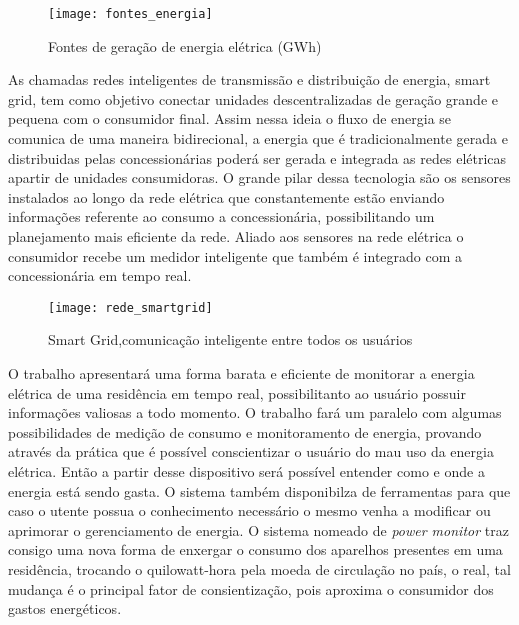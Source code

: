 \begin{figure}[h!]
	\texttt{[image: fontes\_energia]}
	\centering
	\caption[Fontes de geração de energia elétrica (GWh)]{Fontes de geração de energia elétrica (GWh)}
	\label{fig:fonte_energia}
\end{figure}
\FloatBarrier

As chamadas redes inteligentes de transmissão e distribuição de energia, smart grid, tem como objetivo conectar unidades descentralizadas de geração
grande e pequena com o consumidor final. Assim nessa ideia o fluxo de energia se comunica de uma maneira bidirecional, a energia que é tradicionalmente
gerada e distribuidas pelas concessionárias poderá ser gerada e integrada as redes elétricas apartir de unidades consumidoras. O grande pilar dessa 
tecnologia são os sensores instalados ao longo da rede elétrica que constantemente estão enviando informações referente ao consumo a concessionária,
possibilitando um planejamento mais eficiente da rede. Aliado aos sensores na rede elétrica o consumidor recebe um medidor inteligente que também
é integrado com a concessionária em tempo real.

\begin{figure}[h!]
	\texttt{[image: rede\_smartgrid]}
	\centering
	\caption[Smart Grid,comunicação inteligente entre todos os usuários]{Smart Grid,comunicação inteligente entre todos os usuários}
	\label{fig:rede_smartgrid}
\end{figure}
\FloatBarrier

O trabalho apresentará uma forma barata e eficiente de monitorar a energia elétrica de uma residência em tempo real, possibilitanto ao usuário
possuir informações valiosas a todo momento. O trabalho fará um paralelo com algumas possibilidades de medição de consumo e monitoramento
de energia, provando através da prática que é possível conscientizar o usuário do mau uso da energia elétrica.
Então a partir desse dispositivo será possível entender como e onde a energia está sendo gasta. O sistema também disponibilza de ferramentas para que 
caso o utente possua o conhecimento necessário o mesmo venha a modificar ou aprimorar o gerenciamento de energia. O sistema nomeado de \textit{power monitor}
traz consigo uma nova forma de enxergar o consumo dos aparelhos presentes em uma residência, trocando o quilowatt-hora pela moeda de circulação no país,
o real, tal mudança é o principal fator de consientização, pois aproxima o consumidor dos gastos energéticos.


